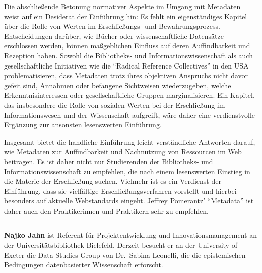 \documentclass[a4paper,
fontsize=11pt,
oneside,
numbers=noperiodatend,
parskip=half-,
bibliography=totoc,
final
]{scrartcl}
\begin{document}
Die abschließende Betonung normativer Aspekte im Umgang mit Metadaten
weist auf ein Desiderat der Einführung hin: Es fehlt ein eigenständiges
Kapitel über die Rolle von Werten im Erschließungs- und
Bewahrungsprozess. Entscheidungen darüber, wie Bücher oder
wissenschaftliche Datensätze erschlossen werden, können maßgeblichen
Einfluss auf deren Auffindbarkeit und Rezeption haben. Sowohl die
Bibliotheks- und Informationswissenschaft als auch gesellschaftliche
Initiativen wie die \enquote{Radical Reference Collectives} in den USA
problematisieren, dass Metadaten trotz ihres objektiven Anspruchs nicht
davor gefeit sind, Annahmen oder befangene Sichtweisen wiederzugeben,
welche Erkenntnisinteressen oder gesellschaftliche Gruppen
marginalisieren. Ein Kapitel, das insbesondere die Rolle von sozialen
Werten bei der Erschließung im Informationswesen und der Wissenschaft
aufgreift, wäre daher eine verdienstvolle Ergänzung zur ansonsten
lesenswerten Einführung.

Insgesamt bietet die handliche Einführung leicht verständliche Antworten
darauf, wie Metadaten zur Auffindbarkeit und Nachnutzung von Ressourcen
im Web beitragen. Es ist daher nicht nur Studierenden der Bibliotheks-
und Informationswissenschaft zu empfehlen, die nach einem lesenswerten
Einstieg in die Materie der Erschließung suchen. Vielmehr ist es ein
Verdienst der Einführung, dass sie vielfältige Erschließungsverfahren
vorstellt und hierbei besonders auf aktuelle Webstandards eingeht.
Jeffrey Pomerantz' \enquote{Metadata} ist daher auch den Praktikerinnen
und Praktikern sehr zu empfehlen.

\begin{center}\rule{0.5\linewidth}{\linethickness}\end{center}

\textbf{Najko Jahn} ist Referent für Projektentwicklung und
Innovationsmanagement an der Universitätsbibliothek Bielefeld. Derzeit
besucht er an der University of Exeter die Data Studies Group von
Dr.~Sabina Leonelli, die die epistemischen Bedingungen datenbasierter
Wissenschaft erforscht.
\end{document}
